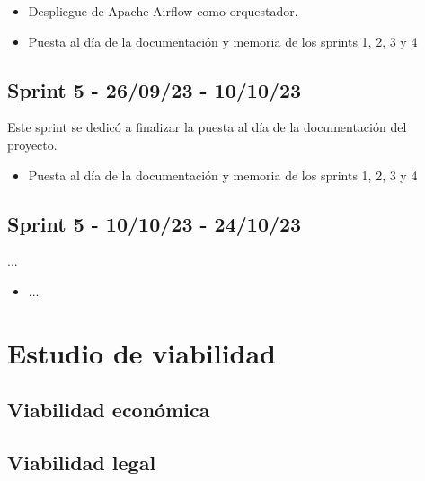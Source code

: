 \begin{itemize}
    \item Despliegue de Apache Airflow como orquestador.
    \item Puesta al día de la documentación y memoria de los sprints 1, 2, 3 y 4
\end{itemize}

\subsection{Sprint 5 -  26/09/23 - 10/10/23}

Este sprint se dedicó a finalizar la puesta al día de la documentación del proyecto.
\begin{itemize}
    \item Puesta al día de la documentación y memoria de los sprints 1, 2, 3 y 4
\end{itemize}

\subsection{Sprint 5 -  10/10/23 - 24/10/23}

...
\begin{itemize}
    \item ...
\end{itemize}


\section{Estudio de viabilidad}

\subsection{Viabilidad económica}

\subsection{Viabilidad legal}

